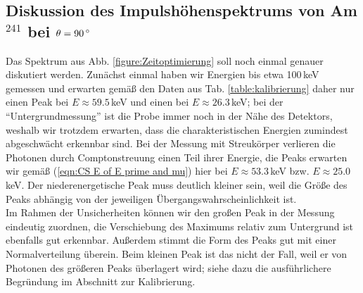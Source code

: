\documentclass[german, parskip=full]{scrartcl}
\begin{document}
\subsection{Diskussion des Impulshöhenspektrums von Am${}^{241}$ bei $\theta=90\,\degree$}
Das Spektrum aus Abb. \ref{figure:Zeitoptimierung} soll noch einmal genauer diskutiert werden. Zunächst einmal haben wir Energien bis etwa 100\,keV gemessen und erwarten gemäß den Daten aus Tab. \ref{table:kalibrierung} daher nur einen Peak bei $E\approx 59.5\,$keV und einen bei $E\approx 26.3\,$keV; bei der ``Untergrundmessung'' ist die Probe immer noch in der Nähe des Detektors, weshalb wir trotzdem erwarten, dass die charakteristischen Energien zumindest abgeschwächt erkennbar sind. Bei der Messung mit Streukörper verlieren die Photonen durch Comptonstreuung einen Teil ihrer Energie, die Peaks erwarten wir gemäß (\ref{eqn:CS E of E prime and mu}) hier bei $E\approx 53.3\,$keV bzw. $E\approx 25.0\,$keV. Der niederenergetische Peak muss deutlich kleiner sein, weil die Größe des Peaks abhängig von der jeweiligen Übergangswahrscheinlichkeit ist. \\
Im Rahmen der Unsicherheiten können wir den großen Peak in der Messung eindeutig zuordnen, die Verschiebung des Maximums relativ zum Untergrund ist ebenfalls gut erkennbar. Außerdem stimmt die Form des Peaks gut mit einer Normalverteilung überein. Beim kleinen Peak ist das nicht der Fall, weil er von Photonen des größeren Peaks überlagert wird; siehe dazu die ausführlichere Begründung im Abschnitt zur Kalibrierung.  
\end{document}
